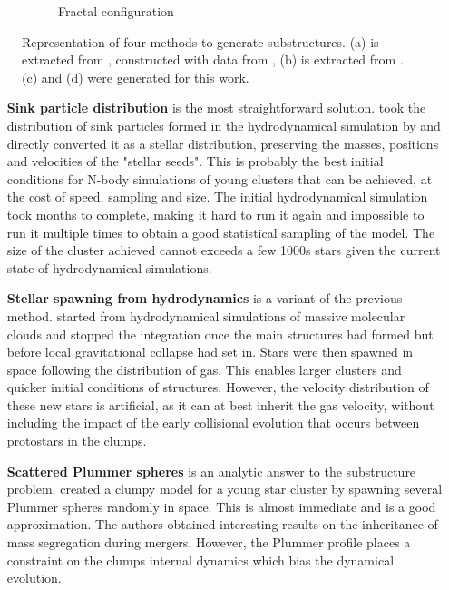 \begin{figure}
\begin{subfigure}[b]{0.48\textwidth}
        \caption{Fractal configuration}
        \label{Fig:0_substructure_3}
    \end{subfigure}
\caption[Representation of four methods to generate substructures]{Representation of four methods to generate substructures. (a) is extracted from \cite{Kruijssen2012}, constructed with data from \cite{Bonnell2003}, (b) is extracted from \cite{Fujii2015}. (c) and (d) were generated for this work.}
\label{Fig:0_substructures}
\end{figure}

 
\begin{itemize}
\item[\textbf{Sink particle distribution}] is the most straightforward solution. \cite{Moeckel2010} took the distribution of sink particles formed in the hydrodynamical simulation by \cite{Bate2009} and directly converted it as a stellar distribution, preserving the masses, positions and velocities of the "stellar seeds". This is probably the best initial conditions for N-body simulations of young clusters that can be achieved, at the cost of speed, sampling and size. The initial hydrodynamical simulation took months to complete, making it hard to run it again and impossible to run it multiple times to obtain a good statistical sampling of the model. The size of the cluster achieved cannot exceeds a few 1000s stars given the current state of hydrodynamical simulations.

\item[\textbf{Stellar spawning from hydrodynamics}] is a variant of the previous method. \cite{Fujii2016} started from hydrodynamical simulations of massive molecular clouds and stopped the integration once the main structures had formed but before local gravitational collapse had set in. Stars were then spawned in space following the distribution of gas. This enables larger clusters and quicker initial conditions of structures. However, the velocity distribution of these new stars is artificial, as it can at best inherit the gas velocity, without including the impact of the early collisional evolution that occurs between protostars in the clumps.

\item[\textbf{Scattered Plummer spheres}] is an analytic answer to the substructure problem. \cite{McMillan2007} created a clumpy model for a young star cluster by spawning several Plummer spheres randomly in space. This is almost immediate and is a good approximation. The authors obtained interesting results on the inheritance of mass segregation during mergers. However, the Plummer profile places a constraint on the clumps internal dynamics which bias the dynamical evolution. 


\end{itemize}
